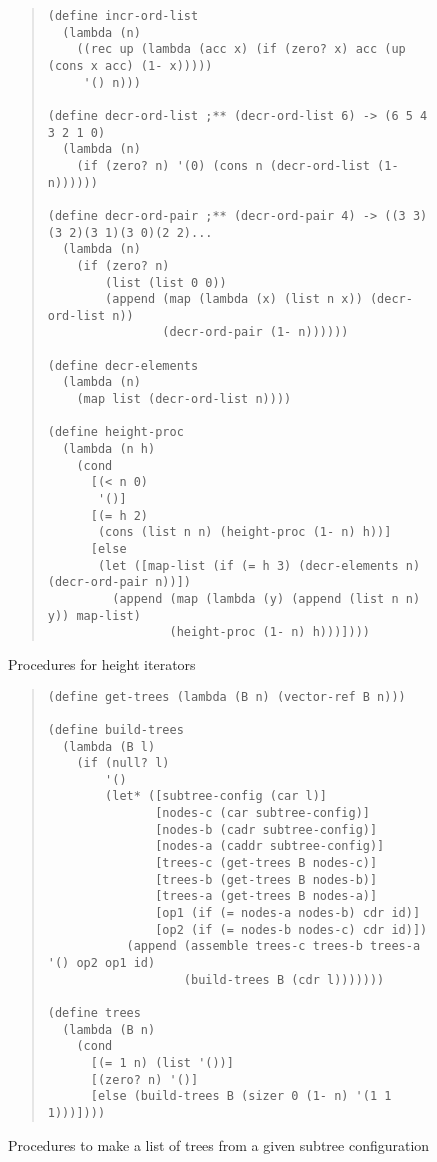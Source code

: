 \begin{figure}
\begin{frameit}
\begin{quote}
\begin{verbatim}
(define incr-ord-list
  (lambda (n)
    ((rec up (lambda (acc x) (if (zero? x) acc (up (cons x acc) (1- x)))))
     '() n)))

(define decr-ord-list ;** (decr-ord-list 6) -> (6 5 4 3 2 1 0)
  (lambda (n)
    (if (zero? n) '(0) (cons n (decr-ord-list (1- n))))))

(define decr-ord-pair ;** (decr-ord-pair 4) -> ((3 3)(3 2)(3 1)(3 0)(2 2)...
  (lambda (n)
    (if (zero? n)
        (list (list 0 0))
        (append (map (lambda (x) (list n x)) (decr-ord-list n))
                (decr-ord-pair (1- n))))))

(define decr-elements
  (lambda (n)
    (map list (decr-ord-list n))))

(define height-proc
  (lambda (n h)
    (cond
      [(< n 0)
       '()]
      [(= h 2)
       (cons (list n n) (height-proc (1- n) h))]
      [else
       (let ([map-list (if (= h 3) (decr-elements n) (decr-ord-pair n))])
         (append (map (lambda (y) (append (list n n) y)) map-list)
                 (height-proc (1- n) h)))])))
\end{verbatim}
\end{quote}
\caption{Procedures for height iterators}
\label{height-iter}
\end{frameit}
\end{figure}

\begin{figure}
\begin{frameit}
\begin{quote}
\begin{verbatim}
(define get-trees (lambda (B n) (vector-ref B n)))

(define build-trees
  (lambda (B l)
    (if (null? l)
        '()
        (let* ([subtree-config (car l)]
               [nodes-c (car subtree-config)]
               [nodes-b (cadr subtree-config)]
               [nodes-a (caddr subtree-config)]
               [trees-c (get-trees B nodes-c)]
               [trees-b (get-trees B nodes-b)]
               [trees-a (get-trees B nodes-a)]
               [op1 (if (= nodes-a nodes-b) cdr id)]
               [op2 (if (= nodes-b nodes-c) cdr id)])
           (append (assemble trees-c trees-b trees-a '() op2 op1 id)
                   (build-trees B (cdr l)))))))

(define trees
  (lambda (B n)
    (cond
      [(= 1 n) (list '())]
      [(zero? n) '()]
      [else (build-trees B (sizer 0 (1- n) '(1 1 1)))])))
\end{verbatim}
\end{quote}
\caption{Procedures to make a list of trees from a given subtree configuration}
\label{fig:new-trees}
\end{frameit}
\end{figure}


